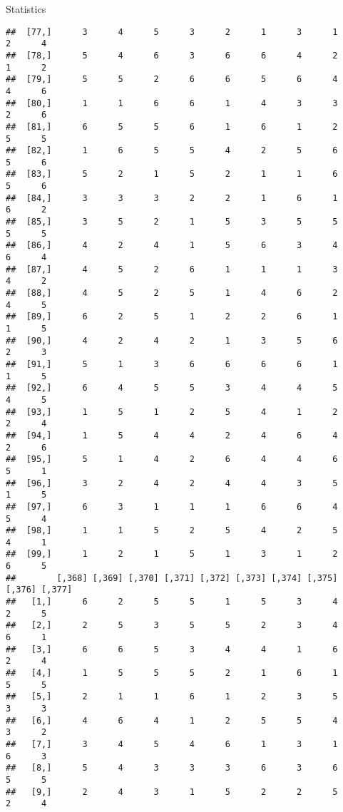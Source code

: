 \documentclass[
  ignorenonframetext,
]{beamer}
\begin{document}
\begin{frame}[fragile]{Statistics}
\begin{verbatim}
##  [77,]      3      4      5      3      2      1      3      1      2      4
##  [78,]      5      4      6      3      6      6      4      2      1      2
##  [79,]      5      5      2      6      6      5      6      4      4      6
##  [80,]      1      1      6      6      1      4      3      3      2      6
##  [81,]      6      5      5      6      1      6      1      2      5      5
##  [82,]      1      6      5      5      4      2      5      6      5      6
##  [83,]      5      2      1      5      2      1      1      6      5      6
##  [84,]      3      3      3      2      2      1      6      1      6      2
##  [85,]      3      5      2      1      5      3      5      5      5      5
##  [86,]      4      2      4      1      5      6      3      4      6      4
##  [87,]      4      5      2      6      1      1      1      3      4      2
##  [88,]      4      5      2      5      1      4      6      2      4      5
##  [89,]      6      2      5      1      2      2      6      1      1      5
##  [90,]      4      2      4      2      1      3      5      6      2      3
##  [91,]      5      1      3      6      6      6      6      1      1      5
##  [92,]      6      4      5      5      3      4      4      5      4      5
##  [93,]      1      5      1      2      5      4      1      2      2      4
##  [94,]      1      5      4      4      2      4      6      4      2      6
##  [95,]      5      1      4      2      6      4      4      6      5      1
##  [96,]      3      2      4      2      4      4      3      5      1      5
##  [97,]      6      3      1      1      1      6      6      4      5      4
##  [98,]      1      1      5      2      5      4      2      5      4      1
##  [99,]      1      2      1      5      1      3      1      2      6      5
##        [,368] [,369] [,370] [,371] [,372] [,373] [,374] [,375] [,376] [,377]
##   [1,]      6      2      5      5      1      5      3      4      2      5
##   [2,]      2      5      3      5      5      2      3      4      6      1
##   [3,]      6      6      5      3      4      4      1      6      2      4
##   [4,]      1      5      5      5      2      1      6      1      5      5
##   [5,]      2      1      1      6      1      2      3      5      3      3
##   [6,]      4      6      4      1      2      5      5      4      3      2
##   [7,]      3      4      5      4      6      1      3      1      6      3
##   [8,]      5      4      3      3      3      6      3      6      5      5
##   [9,]      2      4      3      1      5      2      2      5      2      4

\end{verbatim}
\end{frame}
\end{document}
